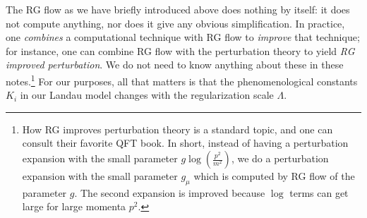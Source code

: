 \documentclass[12pt]{article}
\numberwithin{equation}{section}
\begin{document}
The RG flow as we have briefly introduced above does nothing by itself: it does not compute anything, nor does it give any obvious simplification. In practice, one \emph{combines} a computational technique with RG flow to \emph{improve} that technique; for instance, one can combine RG flow with the perturbation theory to yield \emph{RG improved perturbation}. We do not need to know anything about these in these notes.\footnote{How RG improves perturbation theory is a standard topic, and one can consult their favorite QFT book. In short, instead of having a perturbation expansion with the small parameter $g\log\left(\frac{p^2}{m^2}\right)$, we do a perturbation expansion with the small parameter $g_\mu$ which is computed by RG flow of the parameter $g$. The second expansion is improved because $\log$ terms can get large for large momenta $p^2$.
} For our purposes, all that matters is that the phenomenological constants $K_i$ in our Landau model changes with the regularization scale $\Lambda$. 
\end{document}
